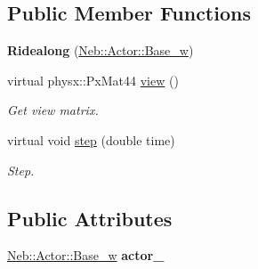 \subsection*{\-Public \-Member \-Functions}
\begin{DoxyCompactItemize}
\item 
\hypertarget{classNeb_1_1Camera_1_1View_1_1Ridealong_aaf5c6034735477249451271b7f0b348a}{{\bfseries \-Ridealong} (\hyperlink{classNeb_1_1weak__ptr}{\-Neb\-::\-Actor\-::\-Base\-\_\-w})}\label{classNeb_1_1Camera_1_1View_1_1Ridealong_aaf5c6034735477249451271b7f0b348a}

\item 
\hypertarget{classNeb_1_1Camera_1_1View_1_1Ridealong_a2e5fe6754e72c5ca4fe7658beafce459}{virtual physx\-::\-Px\-Mat44 \hyperlink{classNeb_1_1Camera_1_1View_1_1Ridealong_a2e5fe6754e72c5ca4fe7658beafce459}{view} ()}\label{classNeb_1_1Camera_1_1View_1_1Ridealong_a2e5fe6754e72c5ca4fe7658beafce459}

\begin{DoxyCompactList}\small\item\em \-Get view matrix. \end{DoxyCompactList}\item 
virtual void \hyperlink{classNeb_1_1Camera_1_1View_1_1Ridealong_a11898b9a6acd7ca864c0a32f12ec6e12}{step} (double time)
\begin{DoxyCompactList}\small\item\em \-Step. \end{DoxyCompactList}\end{DoxyCompactItemize}
\subsection*{\-Public \-Attributes}
\begin{DoxyCompactItemize}
\item 
\hypertarget{classNeb_1_1Camera_1_1View_1_1Ridealong_a6de6424f683789941305dddd6fc07e7c}{\hyperlink{classNeb_1_1weak__ptr}{\-Neb\-::\-Actor\-::\-Base\-\_\-w} {\bfseries actor\-\_\-}}\label{classNeb_1_1Camera_1_1View_1_1Ridealong_a6de6424f683789941305dddd6fc07e7c}

\end{DoxyCompactItemize}


